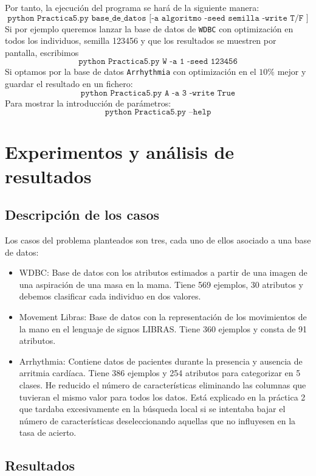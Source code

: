 \documentclass[11pt,leqno]{article}
\begin{document}
Por tanto, la ejecución del programa se hará de la siguiente manera:
\[ \texttt{python Practica5.py base\_de\_datos [-a algoritmo -seed semilla -write T/F ]} \]
Si por ejemplo queremos lanzar la base de datos de \texttt{WDBC} con optimización en todos los individuos, semilla 123456 y que los resultados se muestren por pantalla, escribimos
\[ \texttt{python Practica5.py W -a 1 -seed 123456}\]
Si optamos por la base de datos \texttt{Arrhythmia} con optimización en el $10\%$ mejor y guardar el resultado en un fichero:
\[ \texttt{python Practica5.py A -a 3 -write True}\]
Para mostrar la introducción de parámetros:
\[ \texttt{python Practica5.py --help}\]

\section{Experimentos y análisis de resultados}

\subsection{Descripción de los casos}

Los casos del problema planteados son tres, cada uno de ellos asociado a una base de datos:

\begin{itemize}
\item WDBC: Base de datos con los atributos estimados a partir de una imagen de una aspiración de una masa en la mama. Tiene 569 ejemplos, 30 atributos y debemos clasificar cada individuo en dos valores.
\item Movement Libras: Base de datos con la representación de los movimientos de la mano en el lenguaje de signos LIBRAS. Tiene 360 ejemplos y consta de 91 atributos.
\item Arrhythmia: Contiene datos de pacientes durante la presencia y ausencia de arritmia cardíaca. Tiene 386 ejemplos y 254 atributos para categorizar en 5 clases. He reducido el número de características eliminando las columnas que tuvieran el mismo valor para todos los datos. Está explicado en la práctica 2 que tardaba excesivamente en la búsqueda local si se intentaba bajar el número de características deseleccionando aquellas que no influyesen en la tasa de acierto.
\end{itemize}


\subsection{Resultados}
\end{document}
